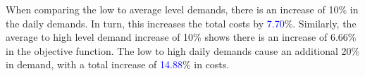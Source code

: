 \documentclass[../thesis.tex]{subfiles}
\begin{document}
{When comparing the low to average level demands, there is an increase of 10\% in the daily demands. In turn, this increases the total costs by \textcolor{blue}{7.70}\%. Similarly, the average to high level demand increase of 10\% shows there is an increase of 6.66\% in the objective function. The low to high daily demands cause an additional 20\% in demand, with a total increase of \textcolor{blue}{14.88}\% in costs.

}
\end{document}
